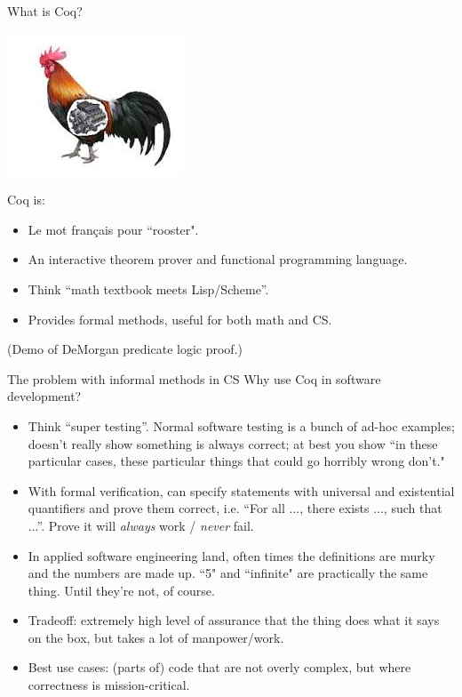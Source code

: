 \documentclass[10pt,handout]{beamer}
\theoremstyle{plain}
\theoremstyle{definition}
\begin{document}
\begin{frame}{What is Coq?} %
\begin{center}
\includegraphics[scale=0.4]{coq}
\end{center}
Coq is:
\begin{itemize}\pause
    \item Le mot fran\c{c}ais pour ``rooster".
    \item An interactive theorem prover and functional programming language. \pause
    \item Think ``math textbook meets Lisp/Scheme''. \pause
    \item Provides formal methods, useful for both math and CS.
\end{itemize} \medskip
(Demo of {\color{red}DeMorgan} predicate logic proof.)
\end{frame}

\begin{frame}{The problem with informal methods in CS}
Why use Coq in software development?
\begin{itemize}
    \item Think ``super testing''.  Normal software testing is a bunch of ad-hoc examples; doesn't really show something is always correct; at best you show ``in these particular cases, these particular things that could go horribly wrong don't." \pause
    \item With formal verification, can specify statements with universal and existential quantifiers and prove them correct, i.e. ``For all ..., there exists ..., such that ...''.  Prove it will \emph{always} work / \emph{never} fail.  \pause
    \item In applied software engineering land, often times the definitions are murky and the numbers are made up.  ``5" and ``infinite" are practically the same thing.  Until they're not, of course. \pause
    \item Tradeoff: extremely high level of assurance that the thing does what it says on the box, but takes a lot of manpower/work.
    \item Best use cases: (parts of) code that are not overly complex, but where correctness is mission-critical.
\end{itemize}
\end{frame}
\end{document}

